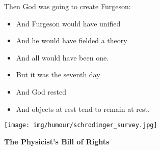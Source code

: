 Then God was going to create Furgeson:
\begin{itemize}
	\item And Furgeson would have unified
	\item And he would have fielded a theory
	\item And all would have been one.
	\item But it was the seventh day
	\item And God rested
	\item And objects at rest tend to remain at rest.
\end{itemize}
\begin{center}\underline{\hspace{5 cm}}\end{center}

	\begin{center}
		\texttt{[image: img/humour/schrodinger\_survey.jpg]}	
	\end{center}

\begin{center}\underline{\hspace{5 cm}}\end{center}
\begin{center}
\textbf{The Physicist's Bill of Rights}
\end{center}

